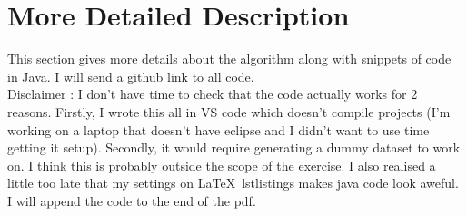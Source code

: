 \documentclass{article}
\begin{document}
	\section{More Detailed Description}
	This section gives more details about the algorithm along with snippets of code in Java. I will send a github link to all code. \\{\color{red}Disclaimer : I don't have time to check that the code actually works for 2 reasons. Firstly, I wrote this all in VS code which doesn't compile projects (I'm working on a laptop that doesn't have eclipse and I didn't want to use time getting it setup). Secondly, it would require generating a dummy dataset to work on. I think this is probably outside the scope of the exercise. I also realised a little too late that my settings on \LaTeX\ lstlistings makes java code look aweful. I will append the code to the end of the pdf.}
\end{document}
